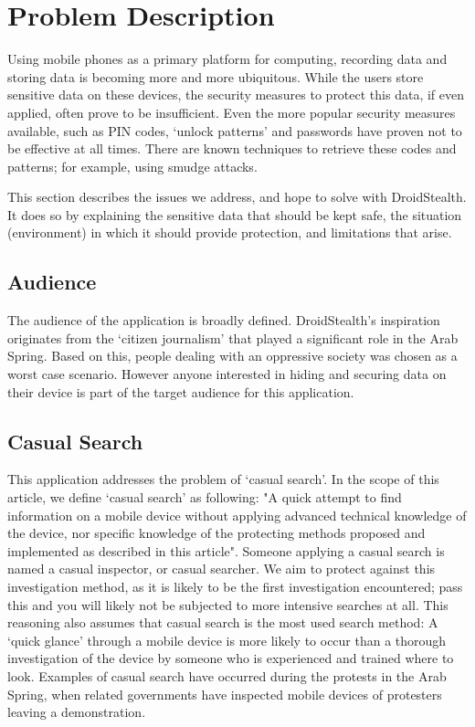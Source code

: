 \section{Problem Description}
\label{sec:problem-description}
Using mobile phones as a primary platform for computing, recording data and storing data is becoming more and more ubiquitous.
While the users store sensitive data on these devices, the security measures to protect this data, if even applied, often prove to be insufficient.
Even the more popular security measures available, such as PIN codes, `unlock patterns' and passwords have proven not to be effective at all times.
There are known techniques to retrieve these codes and patterns; for example, using smudge attacks\cite{aviv2010smudge}.

This section describes the issues we address, and hope to solve with DroidStealth.
It does so by explaining the sensitive data that should be kept safe, the situation (environment) in which it should provide protection, and limitations that arise.

\subsection{Audience}
The audience of the application is broadly defined.
DroidStealth's inspiration originates from the `citizen journalism'\cite{duffy2011} that played a significant role in the Arab Spring. 
Based on this, people dealing with an oppressive society was chosen as a worst case scenario.
However anyone interested in hiding and securing data on their device is part of the target audience for this application.

\subsection{Casual Search}
This application addresses the problem of `casual search'.
In the scope of this article, we define `casual search' as following: 
"A quick attempt to find information on a mobile device without applying advanced technical knowledge of the device, nor specific knowledge of the protecting methods proposed and implemented as described in this article".
Someone applying a casual search is named a casual inspector, or casual searcher.
We aim to protect against this investigation method, as it is likely to be the first investigation encountered; pass this and you will likely not be subjected to more intensive searches at all.
This reasoning also assumes that casual search is the most used search method:
A `quick glance' through a mobile device is more likely to occur than a thorough investigation of the device by someone who is experienced and trained where to look.
Examples of casual search have occurred during the protests in the Arab Spring, when related governments have inspected mobile devices of protesters leaving a demonstration.

